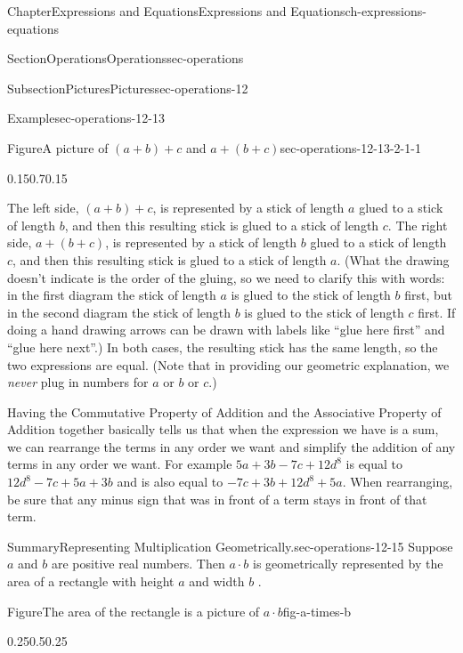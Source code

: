 \documentclass[twoside,11pt,]{book}
\numberwithin{equation}{chapter}
\begin{document}
\begin{chapterptx}{Chapter}{Expressions and Equations}{}{Expressions and Equations}{}{}{ch-expressions-equations}
\begin{sectionptx}{Section}{Operations}{}{Operations}{}{}{sec-operations}
\begin{subsectionptx}{Subsection}{Pictures}{}{Pictures}{}{}{sec-operations-12}
\begin{example}{Example}{}{sec-operations-12-13}
\begin{figureptx}{Figure}{A picture of \((a+b)+c\) and \(a+(b+c)\)}{sec-operations-12-13-2-1-1}{}
\begin{image}{0.15}{0.7}{0.15}{}
{%
}%
\end{image}%
\tcblower
\end{figureptx}%
 The left side, \((a+b)+c\), is represented by a stick of length \(a\) glued to a stick of length \(b\), and then this resulting stick is glued to a stick of length \(c\). The right side, \(a+(b+c)\), is represented by a stick of length \(b\) glued to a stick of length \(c\), and then this resulting stick is glued to a stick of length \(a\). (What the drawing doesn't indicate is the order of the gluing, so we need to clarify this with words: in the first diagram the stick of length \(a\) is glued to the stick of length \(b\) first, but in the second diagram the stick of length \(b\) is glued to the stick of length \(c\) first. If doing a hand drawing arrows can be drawn with labels like ``glue here first'' and ``glue here next''.) In both cases, the resulting stick has the same length, so the two expressions are equal. (Note that in providing our geometric explanation, we \emph{never} plug in numbers for \(a\) or \(b\) or \(c\).)%
\end{example}
Having the Commutative Property of Addition and the Associative Property of Addition together basically tells us that when the expression we have is a sum, we can rearrange the terms in any order we want and simplify the addition of any terms in any order we want. For example \(5a + 3b - 7c + 12d^8\) is equal to \(12d^8 - 7c + 5a + 3b\) and is also equal to \(- 7c + 3b+ 12d^8 + 5a\). When rearranging, be sure that any minus sign that was in front of a term stays in front of that term.%
\begin{assemblage}{Summary}{Representing Multiplication Geometrically.}{sec-operations-12-15}%
Suppose \(a\) and \(b\) are positive real numbers. Then \(a \cdot b\) is geometrically represented by the area of a rectangle with height \(a\) and width \(b\) . \begin{figureptx}{Figure}{The area of the rectangle is a picture of \(a \cdot b\)}{fig-a-times-b}{}%
\begin{image}{0.25}{0.5}{0.25}{}%

\end{image}
\end{figureptx}
\end{assemblage}
\end{subsectionptx}
\end{sectionptx}
\end{chapterptx}
\end{document}
